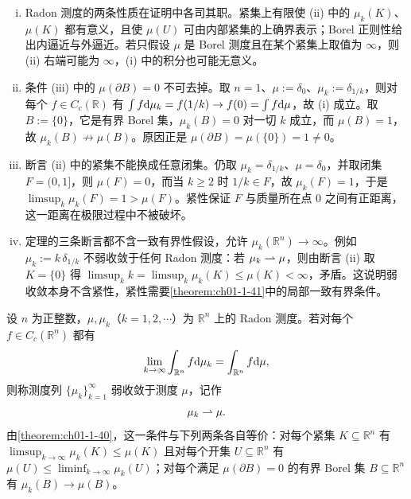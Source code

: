\documentclass[../../main.tex]{subfiles}%
\begin{document}
\begin{remark}\label{remark:ch01-thm-1-40-条件}
\begin{enumerate}[(i)]
\item Radon 测度的两条性质在证明中各司其职。紧集上有限使 (ii) 中的 $\mu_k(K)$、$\mu(K)$ 都有意义，且使 $\mu(U)$ 可由内部紧集的上确界表示；Borel 正则性给出内逼近与外逼近。若只假设 $\mu$ 是 Borel 测度且在某个紧集上取值为 $\infty$，则 (ii) 右端可能为 $\infty$，(i) 中的积分也可能无意义。
\item 条件 (iii) 中的 $\mu(\partial B)=0$ 不可去掉。取 $n=1$、$\mu:=\delta_0$、$\mu_k:=\delta_{1/k}$，则对每个 $f\in C_c(\mathbb{R})$ 有 $\int f\mathrm{d}\mu_k=f(1/k)\to f(0)=\int f\mathrm{d}\mu$，故 (i) 成立。取 $B:=\{0\}$，它是有界 Borel 集，$\mu_k(B)=0$ 对一切 $k$ 成立，而 $\mu(B)=1$，故 $\mu_k(B)\not\to\mu(B)$。原因正是 $\mu(\partial B)=\mu(\{0\})=1\neq0$。
\item 断言 (ii) 中的紧集不能换成任意闭集。仍取 $\mu_k=\delta_{1/k}$、$\mu=\delta_0$，并取闭集 $F=(0,1]$，则 $\mu(F)=0$，而当 $k\geqslant2$ 时 $1/k\in F$，故 $\mu_k(F)=1$，于是 $\limsup_k\mu_k(F)=1>\mu(F)$。紧性保证 $F$ 与质量所在点 $0$ 之间有正距离，这一距离在极限过程中不被破坏。
\item 定理的三条断言都不含一致有界性假设，允许 $\mu_k(\mathbb{R}^n)\to\infty$。例如 $\mu_k:=k\,\delta_{1/k}$ 不弱收敛于任何 Radon 测度：若 $\mu_k\rightharpoonup\mu$，则由断言 (ii) 取 $K=\{0\}$ 得 $\limsup_k k=\limsup_k\mu_k(K)\leqslant\mu(K)<\infty$，矛盾。这说明弱收敛本身不含紧性，紧性需要\cref{theorem:ch01-1-41}中的局部一致有界条件。%
\end{enumerate}
\end{remark}

\begin{definition}[测度的弱收敛]\label{definition:ch01-1-31}
设 $n$ 为正整数，$\mu,\mu_k$（$k=1,2,\cdots$）为 $\mathbb{R}^n$ 上的 Radon 测度。若对每个 $f\in C_c(\mathbb{R}^n)$ 都有
\begin{align*}
\lim_{k\to\infty}\int_{\mathbb{R}^n}f\mathrm{d}\mu_k=\int_{\mathbb{R}^n}f\mathrm{d}\mu,
\end{align*}
则称测度列 $\{\mu_k\}_{k=1}^{\infty}$ 弱收敛于测度 $\mu$，记作
\begin{align*}
\mu_k\rightharpoonup\mu .
\end{align*}
由\cref{theorem:ch01-1-40}，这一条件与下列两条各自等价：对每个紧集 $K\subseteq\mathbb{R}^n$ 有 $\limsup_{k\to\infty}\mu_k(K)\leqslant\mu(K)$ 且对每个开集 $U\subseteq\mathbb{R}^n$ 有 $\mu(U)\leqslant\liminf_{k\to\infty}\mu_k(U)$；对每个满足 $\mu(\partial B)=0$ 的有界 Borel 集 $B\subseteq\mathbb{R}^n$ 有 $\mu_k(B)\to\mu(B)$。%
\end{definition}
\end{document}
